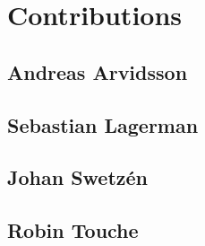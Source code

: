 \section*{Contributions}
\subsection*{Andreas Arvidsson}
\subsection*{Sebastian Lagerman}
\subsection*{Johan Swetz\'en}
\subsection*{Robin Touche}
